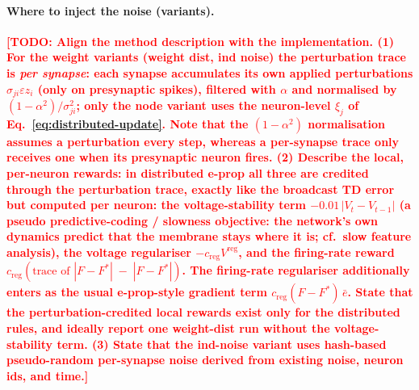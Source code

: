 \documentclass[10pt,twocolumn]{article}
\newcommand{\todo}[1]{\textcolor{red}{\bfseries[TODO: #1]}}
\begin{document}
\paragraph{Where to inject the noise (variants).}
\todo{Align the method description with the implementation. (1) For the weight
variants (weight dist, ind noise) the perturbation trace is \emph{per synapse}:
each synapse accumulates its own applied perturbations $\sigma_{ji}\varepsilon z_i$
(only on presynaptic spikes), filtered with $\alpha$ and normalised by
$(1-\alpha^2)/\sigma_{ji}^2$; only the node variant uses the neuron-level
$\xi_j$ of Eq.~\eqref{eq:distributed-update}. Note that the $(1-\alpha^2)$
normalisation assumes a perturbation every step, whereas a per-synapse trace only
receives one when its presynaptic neuron fires. (2) Describe the local,
per-neuron rewards: in distributed e-prop all three are credited through the
perturbation trace, exactly like the broadcast TD error but computed per neuron:
the voltage-stability term $-0.01\,|V_t-V_{t-1}|$ (a pseudo predictive-coding /
slowness objective: the network's own dynamics predict that the membrane stays
where it is; cf.\ slow feature analysis), the voltage regulariser
$-c_{\mathrm{reg}}V^{\mathrm{reg}}$, and the firing-rate reward
$c_{\mathrm{reg}}(\text{trace of }|F-F^*|\;-\;|F-F^*|)$. The firing-rate
regulariser additionally enters as the usual e-prop-style gradient term
$c_{\mathrm{reg}}(F-F^*)\,\bar e$. State that the perturbation-credited local
rewards exist only for the distributed rules, and ideally report one
weight-dist run without the voltage-stability term. (3) State that the ind-noise variant uses hash-based
pseudo-random per-synapse noise derived from existing noise, neuron ids, and time.}
\end{document}
